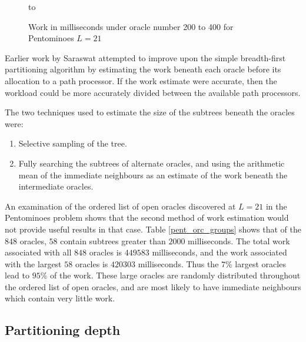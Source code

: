 \begin{figure}[htb]
\vspace{5mm} \hbox to 
\caption{Work in milliseconds under oracle number 200 to 400 for Pentominoes $L=21$}
\vspace{5mm}
\label{pent_orcs_200_to_400}
\end{figure}

Earlier work by Saraswat \cite{Sar95} attempted to improve upon the simple breadth-first partitioning
algorithm by estimating the work beneath each oracle before its allocation to a path processor.
If the work estimate were accurate, then the workload could be more accurately divided between
the available path processors.

The two techniques used to estimate the size of the subtrees beneath the oracles were:
\begin{enumerate}
\item{Selective sampling of the tree.}
\item{Fully searching the subtrees of alternate oracles, and using the arithmetic mean of the
immediate neighbours as an estimate of the work beneath the intermediate oracles.}
\end{enumerate}

An examination of the ordered list of open oracles discovered at $L=21$ in the 
Pentominoes problem shows that the second method of work estimation would not 
provide useful results in that case.  Table \ref{pent_orc_groups} shows that of
the $848$ oracles, $58$ contain subtrees greater than $2000$ milliseconds.  The
total work associated with all $848$ oracles is $449583$ milliseconds, and the work
associated with the largest $58$ oracles is $420303$ milliseconds.  Thus the $7$\%
largest oracles lead to $95$\% of the work.  These large oracles are randomly
distributed throughout the ordered list of open oracles,
and are most likely to have immediate neighbours which contain very little work.


\subsection{Partitioning depth}

